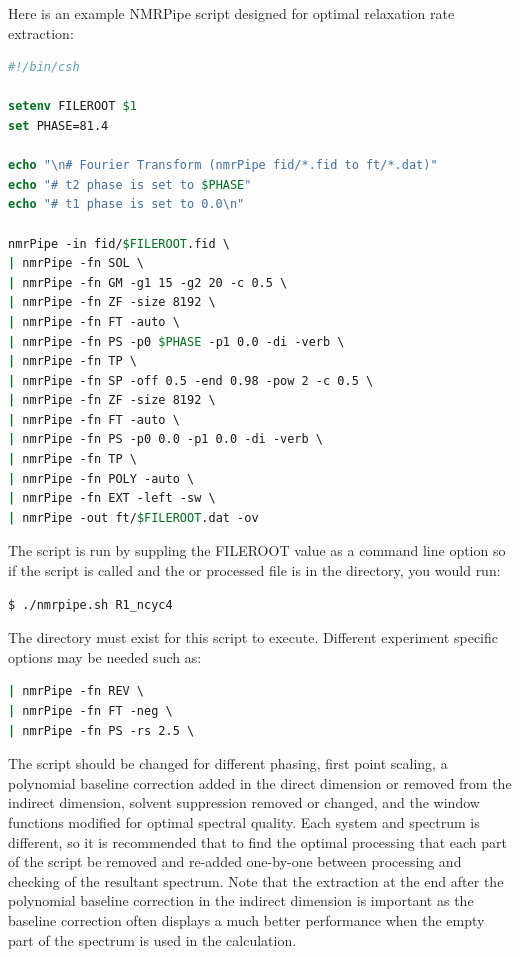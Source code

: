 Here is an example NMRPipe script designed for optimal relaxation rate extraction:
\begin{lstlisting}[language=csh]
#!/bin/csh

setenv FILEROOT $1
set PHASE=81.4

echo "\n# Fourier Transform (nmrPipe fid/*.fid to ft/*.dat)"
echo "# t2 phase is set to $PHASE"
echo "# t1 phase is set to 0.0\n"

nmrPipe -in fid/$FILEROOT.fid \
| nmrPipe -fn SOL \
| nmrPipe -fn GM -g1 15 -g2 20 -c 0.5 \
| nmrPipe -fn ZF -size 8192 \
| nmrPipe -fn FT -auto \
| nmrPipe -fn PS -p0 $PHASE -p1 0.0 -di -verb \
| nmrPipe -fn TP \
| nmrPipe -fn SP -off 0.5 -end 0.98 -pow 2 -c 0.5 \
| nmrPipe -fn ZF -size 8192 \
| nmrPipe -fn FT -auto \
| nmrPipe -fn PS -p0 0.0 -p1 0.0 -di -verb \
| nmrPipe -fn TP \
| nmrPipe -fn POLY -auto \
| nmrPipe -fn EXT -left -sw \
| nmrPipe -out ft/$FILEROOT.dat -ov
\end{lstlisting}

The script is run by suppling the FILEROOT value as a command line option so if the script is called  and the  or  processed file  is in the  directory, you would run:
\begin{lstlisting}[language=bash,numbers=none]
$ ./nmrpipe.sh R1_ncyc4
\end{lstlisting}

The \directory{ft} directory must exist for this script to execute.
Different experiment specific options may be needed such as:
\begin{lstlisting}[language=csh,numbers=none]
| nmrPipe -fn REV \
| nmrPipe -fn FT -neg \
| nmrPipe -fn PS -rs 2.5 \
\end{lstlisting}

The script should be changed for different phasing, first point scaling, a polynomial baseline correction added in the direct dimension or removed from the indirect dimension, solvent suppression removed or changed, and the window functions modified for optimal spectral quality.
Each system and spectrum is different, so it is recommended that to find the optimal processing that each part of the script be removed and re-added one-by-one between processing and checking of the resultant spectrum.
Note that the extraction at the end after the polynomial baseline correction in the indirect dimension is important as the baseline correction often displays a much better performance when the empty part of the spectrum is used in the calculation.



